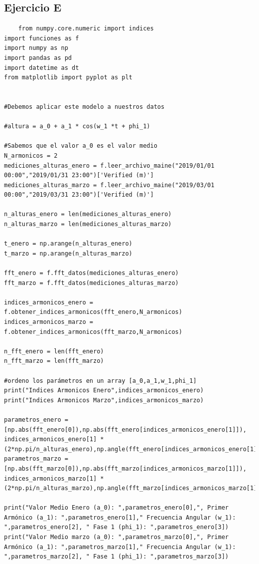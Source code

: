 \documentclass[10pt,a4paper]{article}
\numberwithin{equation}{section}
\numberwithin{figure}{section}
\numberwithin{table}{section}
\begin{document}
\subsection{Ejercicio E}
\begin{verbatim}
    from numpy.core.numeric import indices
import funciones as f
import numpy as np
import pandas as pd
import datetime as dt
from matplotlib import pyplot as plt


#Debemos aplicar este modelo a nuestros datos

#altura = a_0 + a_1 * cos(w_1 *t + phi_1)

#Sabemos que el valor a_0 es el valor medio
N_armonicos = 2 
mediciones_alturas_enero = f.leer_archivo_maine("2019/01/01 00:00","2019/01/31 23:00")['Verified (m)']
mediciones_alturas_marzo = f.leer_archivo_maine("2019/03/01 00:00","2019/03/31 23:00")['Verified (m)']

n_alturas_enero = len(mediciones_alturas_enero)
n_alturas_marzo = len(mediciones_alturas_marzo)

t_enero = np.arange(n_alturas_enero)
t_marzo = np.arange(n_alturas_marzo)

fft_enero = f.fft_datos(mediciones_alturas_enero)
fft_marzo = f.fft_datos(mediciones_alturas_marzo)

indices_armonicos_enero = f.obtener_indices_armonicos(fft_enero,N_armonicos)
indices_armonicos_marzo = f.obtener_indices_armonicos(fft_marzo,N_armonicos)

n_fft_enero = len(fft_enero)
n_fft_marzo = len(fft_marzo)

#ordeno los parámetros en un array [a_0,a_1,w_1,phi_1]
print("Indices Armonicos Enero",indices_armonicos_enero)
print("Indices Armonicos Marzo",indices_armonicos_marzo)

parametros_enero = [np.abs(fft_enero[0]),np.abs(fft_enero[indices_armonicos_enero[1]]), indices_armonicos_enero[1] * (2*np.pi/n_alturas_enero),np.angle(fft_enero[indices_armonicos_enero[1]])]
parametros_marzo = [np.abs(fft_marzo[0]),np.abs(fft_marzo[indices_armonicos_marzo[1]]), indices_armonicos_marzo[1] * (2*np.pi/n_alturas_marzo),np.angle(fft_marzo[indices_armonicos_marzo[1]])] 

print("Valor Medio Enero (a_0): ",parametros_enero[0],", Primer Armónico (a_1): ",parametros_enero[1]," Frecuencia Angular (w_1): ",parametros_enero[2], " Fase 1 (phi_1): ",parametros_enero[3])
print("Valor Medio marzo (a_0): ",parametros_marzo[0],", Primer Armónico (a_1): ",parametros_marzo[1]," Frecuencia Angular (w_1): ",parametros_marzo[2], " Fase 1 (phi_1): ",parametros_marzo[3])


\end{verbatim}
\end{document}
